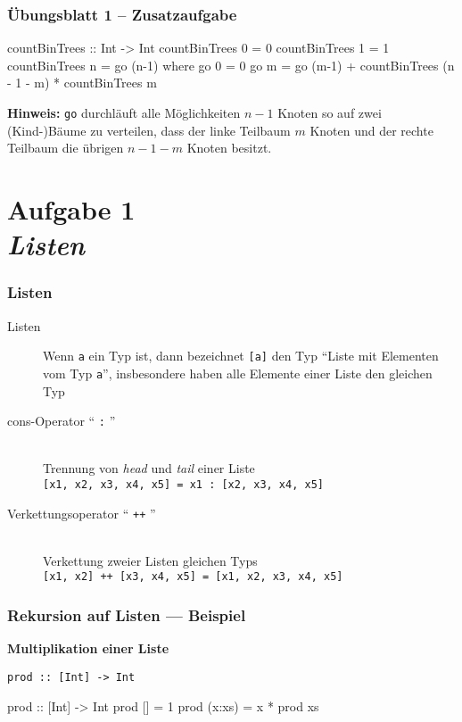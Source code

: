 \documentclass{beamer}
\begin{document}
\begin{frame}[fragile] \frametitle{Übungsblatt 1 -- Zusatzaufgabe}
	\footnotesize
	\begin{codebox}
countBinTrees :: Int -> Int
countBinTrees 0 = 0
countBinTrees 1 = 1
countBinTrees n = go (n-1)
  where
    go 0 = 0
    go m = go (m-1) + countBinTrees (n - 1 - m) * 
                      countBinTrees m
	\end{codebox}

	\textbf{Hinweis:} \texttt{go} durchläuft alle Möglichkeiten $n-1$ Knoten so auf zwei (Kind-)Bäume zu verteilen, dass der linke Teilbaum $m$ Knoten und der rechte Teilbaum die übrigen $n - 1 - m$ Knoten besitzt.
\end{frame}


\section{Aufgabe 1 \\ \textit{\normalsize Listen}}
	\begin{frame}[fragile] \frametitle{Listen}
		\begin{description}
			\item[Listen] Wenn \texttt{a} ein Typ ist, dann bezeichnet \texttt{[a]} den Typ ``Liste mit Elementen vom Typ \texttt{a}'', insbesondere haben alle Elemente einer Liste den gleichen Typ
			\bigskip \pause
			\item[cons-Operator `` \texttt{:} '']  ~\\ 
			Trennung von \textit{head} und \textit{tail} einer Liste \\
			\texttt{[x1, x2, x3, x4, x5] = x1 : [x2, x3, x4, x5]}
			\bigskip \pause
			\item[Verkettungsoperator `` \texttt{++} ''] ~\\ 
			Verkettung zweier Listen gleichen Typs \\
			\texttt{[x1, x2] ++ [x3, x4, x5] = [x1, x2, x3, x4, x5]}
		\end{description}
	\end{frame}


\begin{frame}[t, fragile] \frametitle{Rekursion auf Listen --- Beispiel}
	\textbf{Multiplikation einer Liste}
	
	\texttt{prod :: [Int] -> Int}
	
	\pause \bigskip
	
	\begin{codebox}
prod :: [Int] -> Int
prod []     = 1
prod (x:xs) = x * prod xs
	\end{codebox}
\end{frame}
\end{document}
